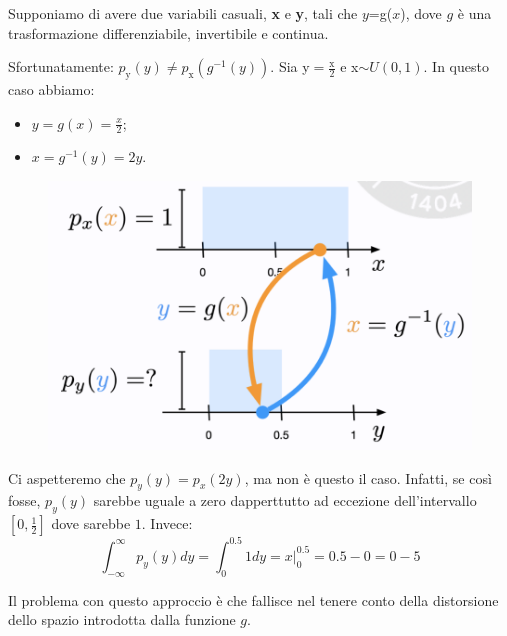 Supponiamo di avere due variabili casuali, \textbf{x} e \textbf{y}, tali che \textbf{$y$}=g(\textbf{$x$}), dove $g$ è una trasformazione differenziabile, invertibile e continua.


Sfortunatamente: $p_\text{y}(y)\neq p_\text{x}(g^{-1}(y))$.
\newline
\newline
Sia y$=\frac{\text{x}}{2}$ e x$\sim U(0,1)$. In questo caso abbiamo:
\begin{itemize}
    \item $y=g(x)=\frac{x}{2}$;
    \item $x=g^{-1}(y)=2y$.
\end{itemize}
\begin{figure}[!h]
    \includegraphics[scale=.5]{images/prerequisites/ex01.png}
    \centering
\end{figure}



Ci aspetteremo che $p_y(y)=p_x(2y)$, ma non è questo il caso. Infatti, se così fosse, $p_y(y)$ sarebbe uguale a zero dapperttutto ad eccezione dell'intervallo $[0,\frac{1}{2}]$ dove sarebbe $1$. Invece:
\begin{equation}
    \int_{-\infty}^\infty p_y(y)dy=\int_0^{0.5}1dy=x\Big|^{0.5}_0=0.5-0=0-5
\end{equation}


Il problema con questo approccio è che fallisce nel tenere conto della distorsione dello spazio introdotta dalla funzione $g$.



